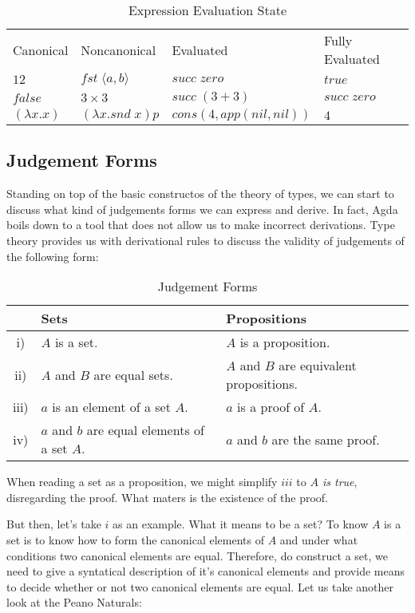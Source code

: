 \begin{center}
\begin{table}[h]
\begin{tabular}{p{3cm} p{3cm} p{3cm} p{3cm}}
  Canonical & Noncanonical & Evaluated & Fully Evaluated \\  
  $12$ & $fst\;\langle a , b \rangle$ & $succ\;zero$ & $true$ \\
  $false$ & $3 \times 3$ & $succ\;(3 + 3)$ & $succ\;zero$ \\
  $(\lambda x . x)$ & $(\lambda x . snd\;x) p$ & $cons(4, app(nil, nil))$ & $4$
\end{tabular}
\caption{Expression Evaluation State}
\end{table}
\end{center}

\subsection{Judgement Forms}
Standing on top of the basic constructos of the theory of types, we can start to discuss
what kind of judgements forms we can express and derive. In fact, Agda boils down to a tool
that does not allow us to make incorrect derivations. Type theory provides us with derivational 
rules to discuss the validity of judgements of the following form:

\begin{center}
\begin{table}[h]
\begin{tabular}{c l l}
       & Sets & Propositions \\ \hline
  i)   & $A$ is a set. & $A$ is a proposition. \\
  ii)  & $A$ and $B$ are equal sets. & $A$ and $B$ are equivalent propositions. \\
  iii) & $a$ is an element of a set $A$. & $a$ is a proof of $A$. \\
  iv)  & $a$ and $b$ are equal elements of a set $A$. & $a$ and $b$ are the same proof. \\  
\end{tabular}
\caption{Judgement Forms}
\end{table}
\end{center}

When reading a set as a proposition, we might simplify $iii$ to \emph{$A$ is true}, disregarding
the proof. What maters is the existence of the proof.

But then, let's take $i$ as an example. What it means to be a set? To know $A$ is a set is
to know how to form the canonical elements of $A$ and under what conditions two canonical
elements are equal. Therefore, do construct a set, we need to give a syntatical description
of it's canonical elements and provide means to decide whether or not two canonical elements
are equal. Let us take another look at the Peano Naturals:

